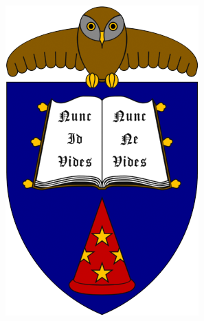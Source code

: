 \documentclass{beamer}\usepackage{graphicx, color}
\begin{document}
\begin{frame}
\begin{columns}
    \begin{column}{0.5\textwidth}
      \includegraphics[width = \textwidth, keepaspectratio = true]{unseen}

    \end{column}

  \end{columns}

\end{frame}
\end{document}
